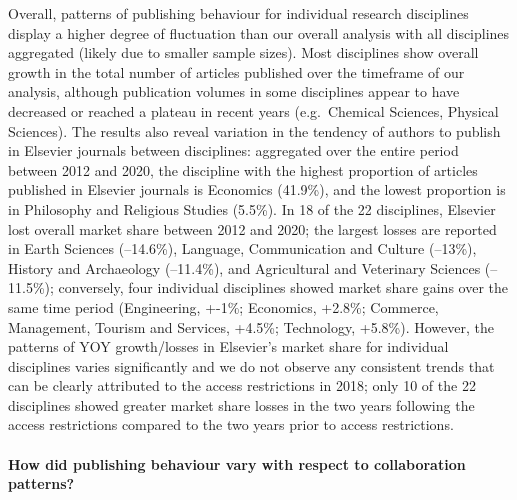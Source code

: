 \documentclass[
]{article}
\begin{document}
Overall, patterns of publishing behaviour for individual research disciplines display a higher degree of fluctuation than our overall analysis with all disciplines aggregated (likely due to smaller sample sizes). Most disciplines show overall growth in the total number of articles published over the timeframe of our analysis, although publication volumes in some disciplines appear to have decreased or reached a plateau in recent years (e.g.~Chemical Sciences, Physical Sciences). The results also reveal variation in the tendency of authors to publish in Elsevier journals between disciplines: aggregated over the entire period between 2012 and 2020, the discipline with the highest proportion of articles published in Elsevier journals is Economics (41.9\%), and the lowest proportion is in Philosophy and Religious Studies (5.5\%). In 18 of the 22 disciplines, Elsevier lost overall market share between 2012 and 2020; the largest losses are reported in Earth Sciences (--14.6\%), Language, Communication and Culture (--13\%), History and Archaeology (--11.4\%), and Agricultural and Veterinary Sciences (--11.5\%); conversely, four individual disciplines showed market share gains over the same time period (Engineering, +-1\%; Economics, +2.8\%; Commerce, Management, Tourism and Services, +4.5\%; Technology, +5.8\%). However, the patterns of YOY growth/losses in Elsevier's market share for individual disciplines varies significantly and we do not observe any consistent trends that can be clearly attributed to the access restrictions in 2018; only 10 of the 22 disciplines showed greater market share losses in the two years following the access restrictions compared to the two years prior to access restrictions.

\hypertarget{how-did-publishing-behaviour-vary-with-respect-to-collaboration-patterns}{%
\paragraph{How did publishing behaviour vary with respect to collaboration patterns?}\label{how-did-publishing-behaviour-vary-with-respect-to-collaboration-patterns}}
\end{document}
